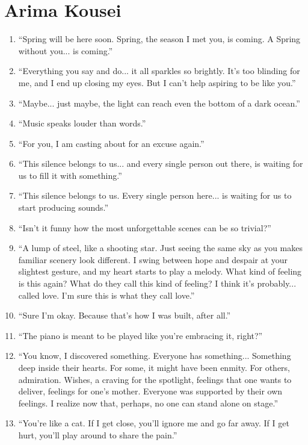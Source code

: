 \documentclass{book}
\numberwithin{equation}{section}
\begin{document}
\section{Arima Kousei}
\begin{enumerate}
    \item ``Spring will be here soon. Spring, the season I met you, is coming. A Spring without you... is coming.''
    \item ``Everything you say and do... it all sparkles so brightly. It's too blinding for me, and I end up closing my eyes. But I can't help aspiring to be like you.''
    \item ``Maybe... just maybe, the light can reach even the bottom of a dark ocean.''
    \item ``Music speaks louder than words.''
    \item ``For you, I am casting about for an excuse again.''
    \item ``This silence belongs to us... and every single person out there, is waiting for us to fill it with something.''
    \item ``This silence belongs to us. Every single person here... is waiting for us to start producing sounds.''
    \item ``Isn't it funny how the most unforgettable scenes can be so trivial?''
    \item ``A lump of steel, like a shooting star. Just seeing the same sky as you makes familiar scenery look different. I swing between hope and despair at your slightest gesture, and my heart starts to play a melody. What kind of feeling is this again? What do they call this kind of feeling? I think it's probably... called love. I'm sure this is what they call love.''
    \item ``Sure I'm okay. Because that's how I was built, after all.''
    \item ``The piano is meant to be played like you're embracing it, right?''
    \item ``You know, I discovered something. Everyone has something... Something deep inside their hearts. For some, it might have been enmity. For others, admiration. Wishes, a craving for the spotlight, feelings that one wants to deliver, feelings for one's mother. Everyone was supported by their own feelings. I realize now that, perhaps, no one can stand alone on stage.''
    \item ``You're like a cat. If I get close, you'll ignore me and go far away. If I get hurt, you'll play around to share the pain.''

\end{enumerate}
\end{document}
